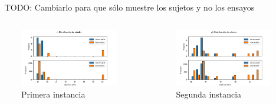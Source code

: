 \documentclass[aspectratio=169]{beamer}
\begin{document}
\begin{frame}{~}
  TODO: Cambiarlo para que sólo muestre los sujetos y no los ensayos
  \begin{columns}
    \begin{column}{0.5\textwidth}
  \begin{figure}
    \centering
    \includegraphics[width=\linewidth]{img/first-ages-distribution.png}
    \caption{Primera instancia}
  \end{figure}
      
    \end{column}
    \begin{column}{0.5\textwidth}
  \begin{figure}
    \centering
    \includegraphics[width=\linewidth]{img/second-ages-distribution.png}
    \caption{Segunda instancia}
  \end{figure}
    \end{column}
  \end{columns}
\end{frame}
\end{document}
